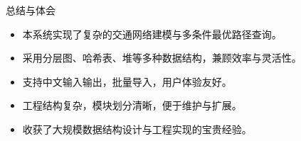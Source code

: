 \documentclass{beamer}
\begin{document}
\begin{frame}{总结与体会}
  \begin{itemize}
    \item 本系统实现了复杂的交通网络建模与多条件最优路径查询。
    \item 采用分层图、哈希表、堆等多种数据结构，兼顾效率与灵活性。
    \item 支持中文输入输出，批量导入，用户体验友好。
    \item 工程结构复杂，模块划分清晰，便于维护与扩展。
    \item 收获了大规模数据结构设计与工程实现的宝贵经验。
  \end{itemize}
\end{frame}
\end{document}
